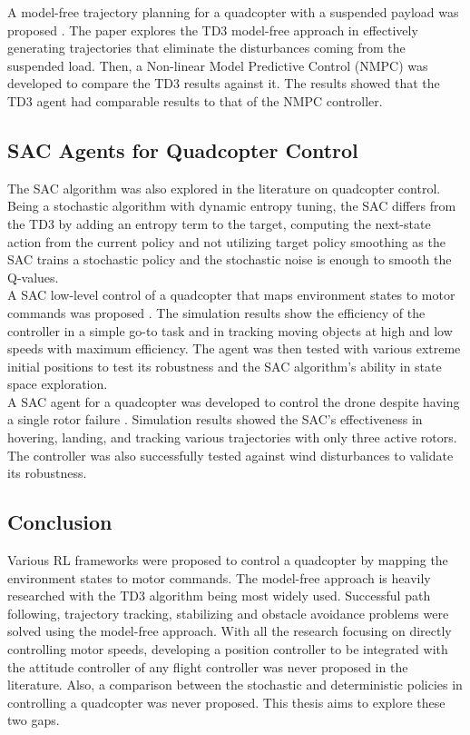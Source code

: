     A model-free trajectory planning for a quadcopter with a suspended payload was proposed \cite{refId0}. The paper explores the TD3 model-free approach in effectively generating trajectories that eliminate the disturbances coming from the suspended load. Then, a Non-linear Model Predictive Control (NMPC) was developed to compare the TD3 results against it. The results showed that the TD3 agent had comparable results to that of the NMPC controller.
    \subsection{SAC Agents for Quadcopter Control}
    The SAC algorithm was also explored in the literature on quadcopter control. Being a stochastic algorithm with dynamic entropy tuning, the SAC differs from the TD3 by adding an entropy term to the target, computing the next-state action from the current policy and not utilizing target policy smoothing as the SAC trains a stochastic policy and the stochastic noise is enough to smooth the Q-values.\\

    A SAC low-level control of a quadcopter that maps environment states to motor commands was proposed \cite{DBLP:journals/corr/abs-2010-02293}. The simulation results show the efficiency of the controller in a simple go-to task and in tracking moving objects at high and low speeds with maximum efficiency. The agent was then tested with various extreme initial positions to test its robustness and the SAC algorithm's ability in state space exploration.\\

    A SAC agent for a quadcopter was developed to control the drone despite having a single rotor failure \cite{DBLP:journals/corr/abs-2109-10488}. Simulation results showed the SAC's effectiveness in hovering, landing, and tracking various trajectories with only three active rotors. The controller was also successfully tested against wind disturbances to validate its robustness.\clearpage
    \subsection{Conclusion}
    Various RL frameworks were proposed to control a quadcopter by mapping the environment states to motor commands. The model-free approach is heavily researched with the TD3 algorithm being most widely used. Successful path following, trajectory tracking, stabilizing and obstacle avoidance problems were solved using the model-free approach. With all the research focusing on directly controlling motor speeds, developing a position controller to be integrated with the attitude controller of any flight controller was never proposed in the literature. Also, a comparison between the stochastic and deterministic policies in controlling a quadcopter was never proposed. This thesis aims to explore these two gaps.

\clearpage
